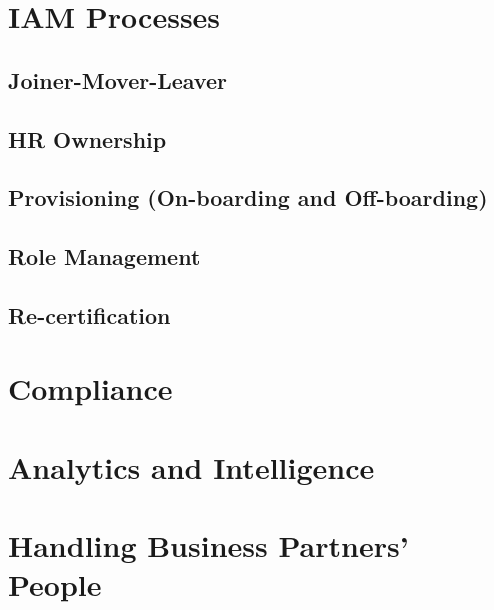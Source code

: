 \hypertarget{iam-processes}{%
\section{IAM Processes}\label{iam-processes}}

\hypertarget{joiner-mover-leaver}{%
\subsection{Joiner-Mover-Leaver}\label{joiner-mover-leaver}}

\hypertarget{hr-ownership}{%
\subsection{HR Ownership}\label{hr-ownership}}

\hypertarget{provisioning-on-boarding-and-off-boarding}{%
\subsection{Provisioning (On-boarding and
Off-boarding)}\label{provisioning-on-boarding-and-off-boarding}}

\hypertarget{role-management}{%
\subsection{Role Management}\label{role-management}}

\hypertarget{re-certification}{%
\subsection{Re-certification}\label{re-certification}}

\hypertarget{compliance}{%
\section{Compliance}\label{compliance}}

\hypertarget{analytics-and-intelligence}{%
\section{Analytics and
Intelligence}\label{analytics-and-intelligence}}

\hypertarget{handling-business-partners-people}{%
\section{Handling Business Partners'
People}\label{handling-business-partners-people}}

